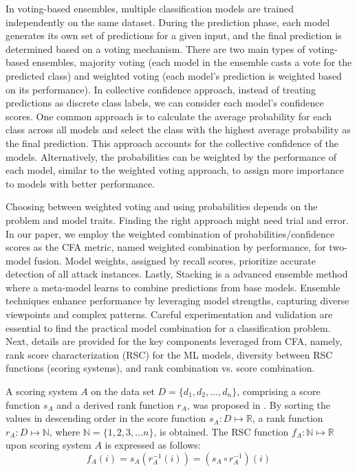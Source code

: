 In voting-based ensembles, multiple classification models are trained independently on the same dataset. During the prediction phase, each model generates its own set of predictions for a given input, and the final prediction is determined based on a voting mechanism. There are two main types of voting-based ensembles, majority voting (each model in the ensemble casts a vote for the predicted class) and weighted voting (each model's prediction is weighted based on its performance). In collective confidence approach, instead of treating predictions as discrete class labels, we can consider each model's confidence scores. One common approach is to calculate the average probability for each class across all models and select the class with the highest average probability as the final prediction. This approach accounts for the collective confidence of the models. Alternatively, the probabilities can be weighted by the performance of each model, similar to the weighted voting approach, to assign more importance to models with better performance.

Choosing between weighted voting and using probabilities depends on the problem and model traits. Finding the right approach might need trial and error. In our paper, we employ the weighted combination of probabilities/confidence scores as the CFA metric, named weighted combination by performance, for two-model fusion. Model weights, assigned by recall scores, prioritize accurate detection of all attack instances. Lastly, Stacking is a advanced ensemble method where a meta-model learns to combine predictions from base models. Ensemble techniques enhance performance by leveraging model strengths, capturing diverse viewpoints and complex patterns. %
Careful experimentation and validation are essential to find the practical model combination for a classification problem. Next, details are provided for the key components leveraged from CFA, namely, rank score characterization (RSC) for the ML models, diversity between RSC functions (scoring systems), and rank combination vs. score combination.


A scoring system $A$ on the data set $D = \{d_1, d_2, ...,d_n\}$, comprising a score function $s_A$ and a derived rank function $r_A$, was proposed in \cite{hsu2002methods}. By sorting the values in descending order in the score function $s_A: D \mapsto \mathbb{R}$, a rank function $r_A: D \mapsto \mathbb{N}$, where $\mathbb{N}=\{1, 2, 3, ...n\}$, is obtained. The RSC function $f_A: \mathbb{N} \mapsto \mathbb{R}$ upon scoring system $A$ is expressed as follows:
\begin{equation}\label{eq:RSC}
f_A(i) = s_A(r_A^{-1}(i)) = (s_A \circ r_A^{-1})(i)
\end{equation}

